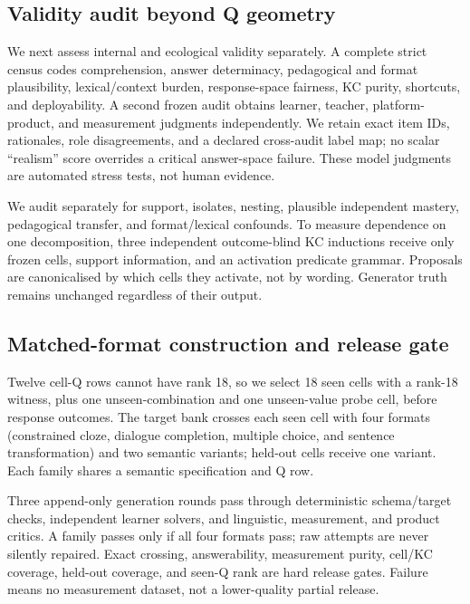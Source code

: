 \subsection{Validity audit beyond Q geometry}

We next assess internal and ecological validity separately.  A complete strict
census codes comprehension, answer determinacy, pedagogical and format
plausibility, lexical/context burden, response-space fairness, KC purity,
shortcuts, and deployability.  A second frozen audit obtains learner, teacher,
platform-product, and measurement judgments independently.  We retain exact
item IDs, rationales, role disagreements, and a declared cross-audit label map;
no scalar ``realism'' score overrides a critical answer-space failure.  These
model judgments are automated stress tests, not human evidence.

We audit \kstar{} separately for support, isolates, nesting, plausible
independent mastery, pedagogical transfer, and format/lexical confounds.  To
measure dependence on one decomposition, three independent outcome-blind KC
inductions receive only frozen cells, support information, and an activation
predicate grammar.  Proposals are canonicalised by which cells they activate,
not by wording.  Generator truth remains unchanged regardless of their output.

\subsection{Matched-format construction and release gate}

Twelve cell-Q rows cannot have rank 18, so we select 18 seen cells with a
rank-18 witness, plus one unseen-combination and one unseen-value probe cell,
before response outcomes.  The target bank crosses each seen cell with four
formats (constrained cloze, dialogue completion, multiple choice, and sentence
transformation) and two semantic variants; held-out cells receive one variant.
Each family shares a semantic specification and Q row.

Three append-only generation rounds pass through deterministic schema/target
checks, independent learner solvers, and linguistic, measurement, and product
critics.  A family passes only if all four formats pass; raw attempts are never
silently repaired.  Exact crossing, answerability, measurement purity, cell/KC
coverage, held-out coverage, and seen-Q rank are hard release gates.  Failure
means no measurement dataset, not a lower-quality partial release.

